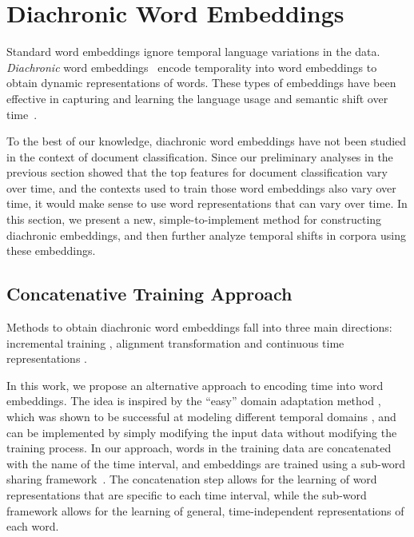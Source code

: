 \section{Diachronic Word Embeddings}
\label{chap3:sec:dwe}

Standard word embeddings ignore temporal language variations in the data. %
\textit{Diachronic} word embeddings~\cite{kulkarni2015statistically} 
encode temporality into word embeddings to obtain dynamic representations of words. 
These types of embeddings have been effective in capturing and learning the language usage and semantic shift over time~\cite{kim2014temporal, kulkarni2015statistically, hamilton2016diachronic, bamler2017dynamic, szymanski2017temporal, rudolph2018dynamic, rosenfeld2018deep, yao2018dynamic}. 

To the best of our knowledge, diachronic word embeddings have not been studied in the context of document classification. 
Since our preliminary analyses in the previous section showed that the top features for document classification vary over time, and the contexts used to train those word embeddings also vary over time, 
it would make sense to use word representations that can vary over time.
In this section, we present a new, simple-to-implement method for constructing diachronic embeddings, and then further analyze temporal shifts in corpora using these embeddings.

\subsection{Concatenative Training Approach}

Methods to obtain diachronic word embeddings fall into three main directions: incremental training \cite{kim2014temporal}, alignment transformation \cite{kulkarni2015statistically, hamilton2016diachronic, yao2018dynamic} and continuous time representations \cite{rosenfeld2018deep, rudolph2018dynamic}.

In this work, we propose an alternative approach 
to encoding time into word embeddings.
The idea is inspired by the ``easy'' domain adaptation method \cite{daume2007frustratingly}, which was shown to be successful at modeling different temporal domains \cite{huang2018examining}, and can be implemented by simply modifying the input data without modifying the training process.
In our approach, words in the training data are concatenated with the name of the time interval,
and embeddings are trained using a sub-word sharing framework~\cite{bojanowski2017enriching}. 
The concatenation step allows for the learning of word representations that are specific to each time interval, while the sub-word framework allows for the learning of general, time-independent representations of each word.

